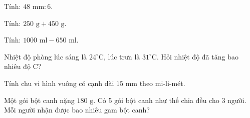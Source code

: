 \begin{ex} %
Tính: $48\text{ mm} : 6$.
\end{ex}

\begin{ex} %
Tính: $250\text{ g} + 450\text{ g}$.
\end{ex}

\begin{ex} %
Tính: $1000\text{ ml} - 650\text{ ml}$.
\end{ex}

\begin{ex} %
Nhiệt độ phòng lúc sáng là $24^\circ\text{C}$, lúc trưa là $31^\circ\text{C}$. Hỏi nhiệt độ đã tăng bao nhiêu độ C?
\end{ex}

\begin{ex} %
Tính chu vi hình vuông có cạnh dài $15\text{ mm}$ theo mi-li-mét.
\end{ex}

\begin{ex} %
Một gói bột canh nặng $180\text{ g}$. Có 5 gói bột canh như thế chia đều cho 3 người. Mỗi người nhận được bao nhiêu gam bột canh?
\end{ex}
